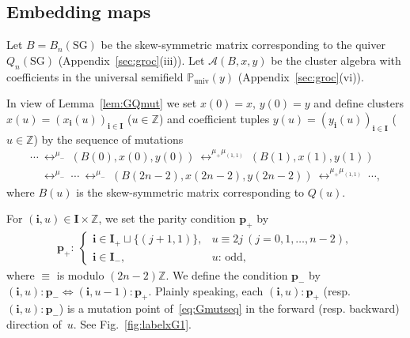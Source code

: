 \documentclass[11pt]{article}
\numberwithin{equation}{section}
\theoremstyle{definition}
\begin{document}
\subsection{Embedding maps}
Let
 $B=B_{n}(\mathrm{SG})$
be the skew-symmetric matrix corresponding
to the quiver $Q_{n}(\mathrm{SG})$ (Appendix~\ref{sec:groc}(iii)).
Let $\mathcal{A}(B,x,y)$
be the cluster algebra
 with coef\/f\/icients
in the universal
semif\/ield
$\mathbb{P}_{\mathrm{univ}}(y)$ (Appendix~\ref{sec:groc}(vi)).



In view of Lemma~\ref{lem:GQmut}
we set $x(0)=x$, $y(0)=y$ and def\/ine
clusters $x(u)=(x_{\mathbf{i}}(u))_{\mathbf{i}\in \mathbf{I}}$
 ($u\in \mathbb{Z}$)
 and coef\/f\/icient tuples $y(u)=(y_\mathbf{i}(u))_{\mathbf{i}\in \mathbf{I}}$
 ($u\in \mathbb{Z}$)
by the sequence of mutations
\begin{gather}
\cdots
\ \mathop{\longleftrightarrow}^{\mu_-}\
(B(0),x(0),y(0))
\ \mathop{\longleftrightarrow}^{\mu_+
\mu_{(1,1)}}\
(B(1),x(1),y(1))\nonumber\\
\phantom{\cdots}{} \ \mathop{\longleftrightarrow}^{\mu_-}\
\cdots
\ \mathop{\longleftrightarrow}^{\mu_-}\
(B(2n-2),x(2n-2),y(2n-2))
\ \mathop{\longleftrightarrow}^{\mu_+
\mu_{(1,1)}}\
\cdots,\label{eq:Gmutseq}
\end{gather}
where $B(u)$ is the skew-symmetric matrix corresponding to
$Q(u)$.

For  $(\mathbf{i},u)\in
 \mathbf{I}\times \mathbb{Z}$,
we set the parity condition $\mathbf{p}_+$ by
\begin{gather}
\label{eq:GQparity}
\mathbf{p}_+: \
\begin{cases}
 \mathbf{i}\in
\mathbf{I}_+ \sqcup
\{(j+1,1)\},
& u\equiv 2j
\ (j=0,1,\dots,n-2),\\
 \mathbf{i}\in
\mathbf{I}_-,
& \mbox{$u$: odd},
\end{cases}
\end{gather}
where $\equiv$ is modulo $(2n-2)\mathbb{Z}$.
We def\/ine the condition $\mathbf{p}_-$
by $(\mathbf{i},u):\mathbf{p}_- \Longleftrightarrow
(\mathbf{i},u-1):\mathbf{p}_+$.
Plainly speaking,
each $(\mathbf{i},u):\mathbf{p}_+$
(resp.\ $(\mathbf{i},u):\mathbf{p}_-$)
is a mutation point of~\eqref{eq:Gmutseq} in the forward
(resp. backward) direction of~$u$.
See Fig.~\ref{fig:labelxG1}.
\end{document}
